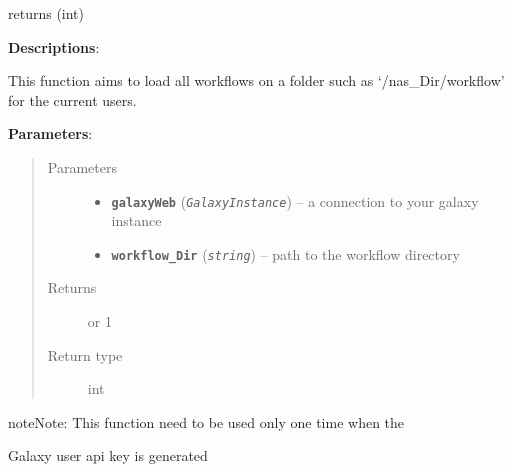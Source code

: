 \documentclass[letterpaper,10pt,english]{sphinxmanual}
\begin{document}
\begin{fulllineitems}
\label{datamanagerpkg:datamanagerpkg.GalaxyCommunication_data_manager.addAllWorkflow}
returns (int)

\textbf{Descriptions}:

This function aims to load all workflows on a folder such as 
`/nas\_Dir/workflow' for the current users.

\textbf{Parameters}:
\begin{quote}\begin{description}
\item[{Parameters}] \leavevmode\begin{itemize}
\item {} 
\textbf{\texttt{galaxyWeb}} (\emph{\texttt{GalaxyInstance}}) -- a connection to your galaxy instance

\item {} 
\textbf{\texttt{workflow\_Dir}} (\emph{\texttt{string}}) -- path to the workflow directory

\end{itemize}

\item[{Returns}]  or 1

\item[{Return type}] \leavevmode
int

\end{description}\end{quote}

\begin{notice}{note}{Note:}
This function need to be used only one time when the
\end{notice}

Galaxy user api key is generated

\end{fulllineitems}

\end{document}
